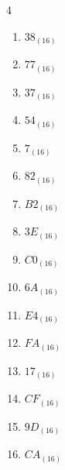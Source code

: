 \begin{multicols}{4}
\begin{enumerate}
  \item $38_{(16)}$

        \phantom{$=56$}

  \item $77_{(16)}$

        \phantom{$=119$}

  \item $37_{(16)}$

        \phantom{$=55$}

  \item $54_{(16)}$

        \phantom{$=84$}

  \item $7_{(16)}$

        \phantom{$=7$}

  \item $82_{(16)}$

        \phantom{$=130$}

  \item $B2_{(16)}$

        \phantom{$=178$}

  \item $3E_{(16)}$

        \phantom{$=62$}

  \item $C0_{(16)}$

        \phantom{$=192$}

  \item $6A_{(16)}$

        \phantom{$=106$}

  \item $E4_{(16)}$

        \phantom{$=228$}

  \item $FA_{(16)}$

        \phantom{$=250$}

  \item $17_{(16)}$

        \phantom{$=23$}

  \item $CF_{(16)}$

        \phantom{$=207$}

\columnbreak %

  \item $9D_{(16)}$

        \phantom{$=157$}

  \item $CA_{(16)}$


\end{enumerate}
\end{multicols}
